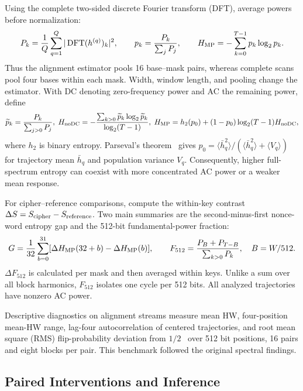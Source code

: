 \documentclass[electronics,article,submit,pdftex,oneauthor]{Definitions/mdpi}
\begin{document}
Using the complete two-sided discrete Fourier transform (DFT), average powers before normalization:
\begin{equation}
 P_k=\frac1Q\sum_{q=1}^{Q}|\operatorname{DFT}(h^{(q)})_k|^2,
 \qquad p_k=\frac{P_k}{\sum_jP_j},\qquad
 H_{\rm MP}=-\sum_{k=0}^{T-1}p_k\log_2p_k .
 \label{eq:entropy}
\end{equation}
Thus the alignment estimator pools 16 base--mask pairs, whereas complete scans pool four bases within each mask. Width, window length, and pooling change the estimator. With DC denoting zero-frequency power and AC the remaining power, define
\begin{equation}
 \widetilde p_k=\frac{P_k}{\sum_{j>0}P_j},\;
 H_{\rm noDC}=-\frac{\sum_{k>0}\widetilde p_k\log_2\widetilde p_k}{\log_2(T-1)},\;
 H_{\rm MP}=h_2(p_0)+(1-p_0)\log_2(T-1)H_{\rm noDC},
 \label{eq:identity}
\end{equation}
where $h_2$ is binary entropy. Parseval's theorem~\citep{oppenheim2010} gives $p_0=\langle\bar h_q^2\rangle/(\langle\bar h_q^2\rangle+\langle V_q\rangle)$ for trajectory mean $\bar h_q$ and population variance $V_q$. Consequently, higher full-spectrum entropy can coexist with more concentrated AC power or a weaker mean response.

For cipher--reference comparisons, compute the within-key contrast $\Delta S=S_{\rm cipher}-S_{\rm reference}$. Two main summaries are the second-minus-first nonce-word entropy gap and the 512-bit fundamental-power fraction:
\begin{equation}
 G=\frac1{32}\sum_{b=0}^{31}[\Delta H_{\rm MP}(32+b)-\Delta H_{\rm MP}(b)],
 \qquad F_{512}=\frac{P_B+P_{T-B}}{\sum_{k>0}P_k},\quad B=W/512.
 \label{eq:gapfundamental}
\end{equation}
$\Delta F_{512}$ is calculated per mask and then averaged within keys. Unlike a sum over all block harmonics, $F_{512}$ isolates one cycle per 512 bits. All analyzed trajectories have nonzero AC power.

Descriptive diagnostics on alignment streams measure mean HW, four-position mean-HW range, lag-four autocorrelation of centered trajectories, and root mean square (RMS) flip-probability deviation from $1/2$~\citep{webster1986} over 512 bit positions, 16 pairs and eight blocks per pair. This benchmark followed the original spectral findings.

\subsection{Paired Interventions and Inference}\label{sec:interventions}
\end{document}
